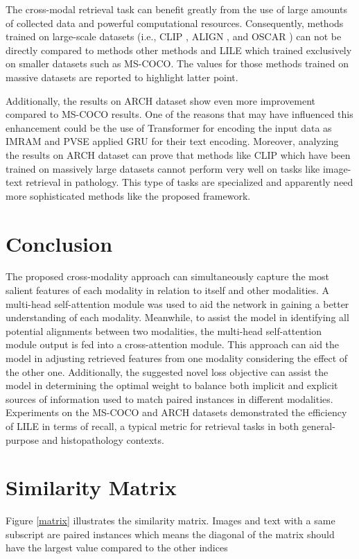 \documentclass{midl}
\begin{document}
The cross-modal retrieval task can benefit greatly from the use of large amounts of collected data and powerful computational resources. Consequently, methods trained on large-scale datasets (i.e., CLIP \cite{radford2019language}, ALIGN \cite{jia2021scaling}, and OSCAR \cite{li2020oscar}) can not be directly compared to methods other methods and LILE which trained exclusively on smaller datasets such as MS-COCO. The values for those methods trained on massive datasets are reported to highlight latter point.

Additionally, the results on ARCH dataset show even more improvement compared to MS-COCO results. One of the reasons that may have influenced this enhancement could be the use of Transformer for encoding the input data as IMRAM \cite{song2019polysemous} and PVSE \cite{song2019polysemous} applied GRU for their text encoding. Moreover, analyzing the results on ARCH dataset can prove that methods like CLIP \cite{radford2021learning} which have been trained on massively large datasets cannot perform very well on tasks like image-text retrieval in pathology. This type of tasks are specialized and apparently need more sophisticated methods like the proposed framework.

\section{Conclusion}
The proposed cross-modality approach can simultaneously capture the most salient features of each modality in relation to itself and other modalities. A multi-head self-attention module was used to aid the network in gaining a better understanding of each modality. Meanwhile, to assist the model in identifying all potential alignments between two modalities, the multi-head self-attention module output is fed into a cross-attention module. This approach can aid the model in adjusting retrieved features from one modality considering the effect of the other one. Additionally, the suggested novel loss objective can assist the model in determining the optimal weight to balance both implicit and explicit sources of information used to match paired instances in different modalities. Experiments on the MS-COCO and ARCH datasets demonstrated the efficiency of LILE in terms of recall, a typical metric for retrieval tasks in both general-purpose and histopathology contexts.


 
\newpage
\appendix

\section{Similarity Matrix}\label{appa}
Figure \ref{matrix} illustrates the similarity matrix.  Images and text with a same subscript are paired instances which means the diagonal of the matrix should have the largest value compared to the other indices
\end{document}
